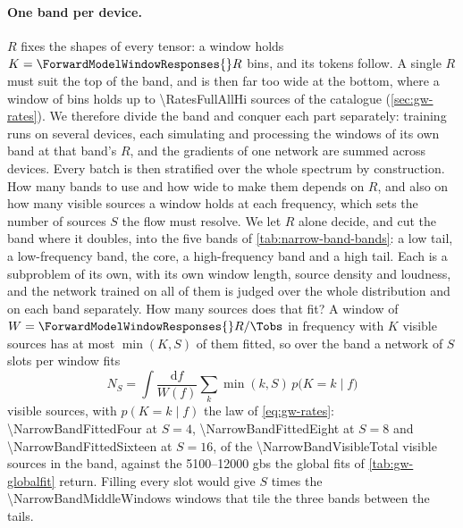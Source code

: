 \paragraph{One band per device.}
$R$ fixes the shapes of every tensor: a window holds $K=\ForwardModelWindowResponses{}R$ bins, and
its tokens follow. A single $R$ must suit the top of the band, and is then far too wide at the
bottom, where a window of \RatesFullWindow{} bins holds up to \num{\RatesFullAllHi} sources of the
catalogue (\cref{sec:gw-rates}). We therefore divide the band and conquer each part separately:
training runs on several devices, each simulating and processing the windows of its own band at
that band's $R$, and the gradients of one network are summed across devices. Every batch is then
stratified over the whole spectrum by construction. How many bands to use and how wide to make them
depends on $R$, and also on how many visible sources a window holds at each frequency, which sets
the number of sources $S$ the flow must resolve. We let $R$ alone decide, and cut the band where it
doubles, into the five bands of \cref{tab:narrow-band-bands}: a low tail, a low-frequency band, the
core, a high-frequency band and a high tail. Each is a subproblem of its own, with its own window
length, source density and loudness, and the network trained on all of them is judged over the whole
distribution and on each band separately. How many sources does that fit? A window of $W=\ForwardModelWindowResponses{}R/\Tobs$ in frequency
with $K$ visible sources has at most $\min(K,S)$ of them fitted, so over the band a network of $S$ slots
per window fits
\begin{equation}
  N_S = \int \frac{\mathrm{d}f}{W(f)} \sum_k \min(k,S)\,p\bigl(K=k\mid f\bigr)
  \label{eq:narrow-band-fitted}
\end{equation}
visible sources, with $p(K=k\mid f)$ the law of \cref{eq:gw-rates}: \num{\NarrowBandFittedFour} at
$S=4$, \num{\NarrowBandFittedEight} at $S=8$ and \num{\NarrowBandFittedSixteen} at $S=16$, of the
\num{\NarrowBandVisibleTotal} visible sources in the band, against the \numrange{5100}{12000} \acp{gb}
the global fits of \cref{tab:gw-globalfit} return. Filling every slot would give $S$ times the
\num{\NarrowBandMiddleWindows} windows that tile the three bands between the tails.

